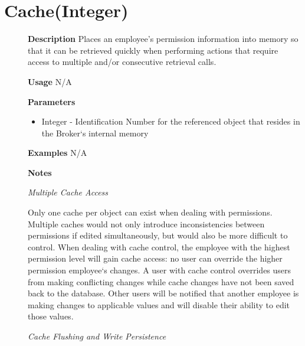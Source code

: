 \documentclass[letterpaper,12pt]{report}
\begin{document}
{
\pagebreak
\section{Cache(Integer)}
    \begin{description}
      \item[] \textbf{Description}
	  \newline \hspace*{1cm} Places an employee's permission information into memory so that it can be retrieved quickly when performing actions that require access to multiple and/or consecutive retrieval calls. 
      \item[] \textbf{Usage}
	  \newline \hspace*{1cm} N/A
      \item[] \textbf{Parameters}
	  \begin{itemize}
	   \item Integer - Identification Number for the referenced object that resides in the Broker`s internal memory
	  \end{itemize}
      \item[] \textbf{Examples}
	  \newline \hspace*{1cm} N/A
      \item[] \textbf{Notes}
	  \par \noindent
	  \textit{Multiple Cache Access}
	  \par \noindent \hspace*{1cm} Only one cache per object can exist when dealing with permissions. Multiple caches would not only introduce inconsistencies between permissions if edited simultaneously, but would also be more difficult to control. When dealing with cache control, the employee with the highest permission level will gain cache access: no user can override the higher permission employee`s changes. A user with cache control overrides users from making conflicting changes while cache changes have not been saved back to the database. Other users will be notified that another employee is making changes to applicable values and will disable their ability to edit those values. 
	  \par \noindent
	  \textit{Cache Flushing and Write Persistence}

\end{description}}
\end{document}
